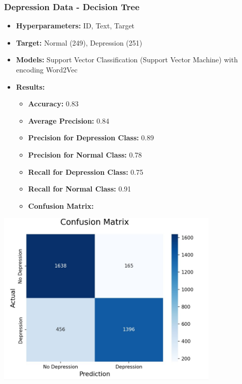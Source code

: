 \documentclass[a4paper,12pt]{article}
\begin{document}
\vspace{0.5cm} %

\subsubsection{Depression Data - Decision Tree}
\begin{itemize}
    \item \textbf{Hyperparameters:} ID, Text, Target
    \item \textbf{Target:} Normal (249), Depression (251)
    \item \textbf{Models:} Support Vector Classification (Support Vector Machine) with encoding Word2Vec
    \item \textbf{Results:}
    \begin{itemize}
        \item \textbf{Accuracy:} 0.83
        \item \textbf{Average Precision:} 0.84
        \item \textbf{Precision for Depression Class:} 0.89
        \item \textbf{Precision for Normal Class:} 0.78
        \item \textbf{Recall for Depression Class:} 0.75
        \item \textbf{Recall for Normal Class:} 0.91
        \item \textbf{Confusion Matrix:}
    \end{itemize}
\end{itemize}

\begin{center}
    \includegraphics[width=0.8\textwidth]{Depression-Data-DecisionTree.jpg} %
\end{center}
\end{document}
